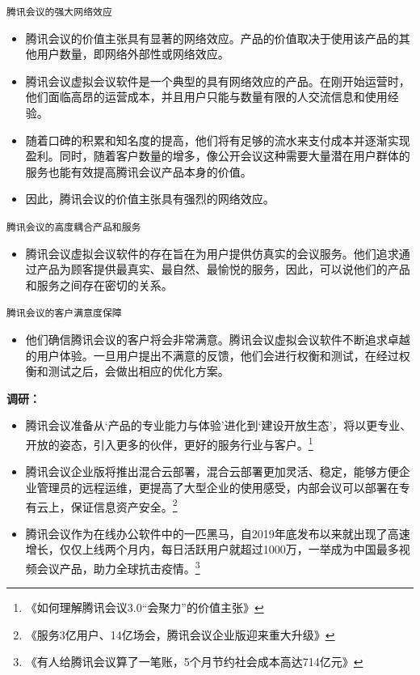 \documentclass[a4paper,12pt]{article}
\begin{document}
\texttt{腾讯会议的强大网络效应}

\begin{itemize}
  \item 腾讯会议的价值主张具有显著的网络效应。产品的价值取决于使用该产品的其他用户数量，即网络外部性或网络效应。
  
  \item 腾讯会议虚拟会议软件是一个典型的具有网络效应的产品。在刚开始运营时，他们面临高昂的运营成本，并且用户只能与数量有限的人交流信息和使用经验。
  
  \item 随着口碑的积累和知名度的提高，他们将有足够的流水来支付成本并逐渐实现盈利。同时，随着客户数量的增多，像公开会议这种需要大量潜在用户群体的服务也能有效提高腾讯会议产品本身的价值。
  
  \item 因此，腾讯会议的价值主张具有强烈的网络效应。
\end{itemize}

\texttt{腾讯会议的高度耦合产品和服务}

\begin{itemize}
  \item 腾讯会议虚拟会议软件的存在旨在为用户提供仿真实的会议服务。他们追求通过产品为顾客提供最真实、最自然、最愉悦的服务，因此，可以说他们的产品和服务之间存在密切的关系。
\end{itemize}

\texttt{腾讯会议的客户满意度保障}

\begin{itemize}
  \item 他们确信腾讯会议的客户将会非常满意。腾讯会议虚拟会议软件不断追求卓越的用户体验。一旦用户提出不满意的反馈，他们会进行权衡和测试，在经过权衡和测试之后，会做出相应的优化⽅案。
\end{itemize}
\textbf{调研：}
\begin{itemize}
    \item 腾讯会议准备从‘产品的专业能力与体验’进化到‘建设开放生态’，将以更专业、开放的姿态，引入更多的伙伴，更好的服务行业与客户。\footnote{《如何理解腾讯会议3.0“会聚力”的价值主张》}
    \item 腾讯会议企业版将推出混合云部署，混合云部署更加灵活、稳定，能够方便企业管理员的远程运维，更提高了大型企业的使用感受，内部会议可以部署在专有云上，保证信息资产安全。\footnote{《服务3亿用户、14亿场会，腾讯会议企业版迎来重大升级》}
    \item 腾讯会议作为在线办公软件中的一匹黑马，自2019年底发布以来就出现了高速增长，仅仅上线两个月内，每日活跃用户就超过1000万，一举成为中国最多视频会议产品，助力全球抗击疫情。\footnote{《有人给腾讯会议算了一笔账，5个月节约社会成本高达714亿元》}
\end{itemize}
\end{document}
